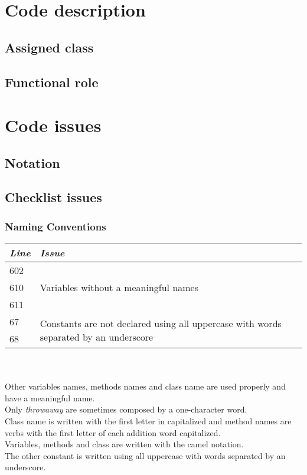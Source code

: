 \documentclass[11pt,a4paper]{report}
\begin{document}


\thispagestyle{empty}
\tableofcontents
\cleardoublepage
{}
\pagestyle{fancy}

\chapter{Code description}
\section{Assigned class}
\section{Functional role}
\chapter{Code issues}
\section{Notation}
\section{Checklist issues}
\subsection{Naming Conventions}
\begin{tabularx}{\textwidth}{|l|X|}
	\hline
	\textit{Line} & \textit{Issue}\\
	\hline
	602 & \multirow{3}{*}{Variables without a meaningful names}\\
	610 & \\
	611 & \\
	\hline
	\hline
	67 & \multirow{2}{*}{Constants are not declared using all uppercase with words separated by an underscore}\\
	68 & \\
	\hline
\end{tabularx}
\\\\
Other variables names, methods names and class name are used properly and have a meaningful name.\\Only \textit{throwaway} are sometimes composed by a one-character word.\\Class name is written with the first letter in capitalized and method names are verbs with the first letter of each addition word capitalized.\\Variables, methods and class are written with the camel notation.\\The other constant is written using all uppercase with words separated by an underscore.
\end{document}

